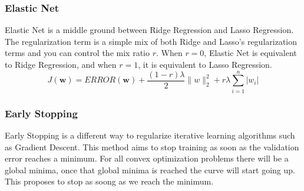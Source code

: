 \documentclass[12pt]{article}
\begin{document}
        \subsubsection{Elastic Net}
            Elastic Net is a middle ground between Ridge Regression and Lasso Regression. The regularization term is a simple mix of both Ridge and Lasso's regularization terms and you can control the mix
            ratio $r$. When $r = 0$, Elastic Net is equivalent to Ridge Regression, and when $r = 1$, it is equivalent to Lasso Regression.
            $$ J(\boldsymbol{w}) = ERROR(\boldsymbol{w}) + \frac{(1-r)\lambda}{2}\|w\|^2_2 +  r\lambda\sum_{i=1}^n|w_i| $$
        
        \subsubsection{Early Stopping}
            Early Stopping is a different way to regularize iterative learning algorithms such as Gradient Descent. This method aims to stop training as soon as the validation error reaches a minimum. For all
        convex optimization problems there will be a global minima, once that global minima is reached the curve will start going up. This proposes to stop as soong as we reach the minimum.

\printindex
\end{document}
